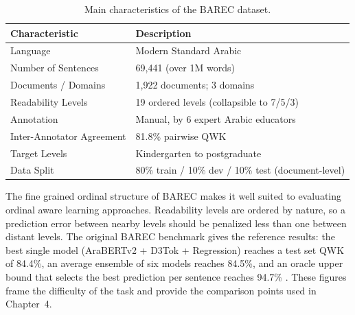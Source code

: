 \documentclass[12pt]{report}
\begin{document}
\begin{table}[H]

\centering

\caption{Main characteristics of the BAREC dataset.}

\label{tab:barec_characteristics}

\begin{tabular}{p{5cm} p{6cm}}

\toprule

\textbf{Characteristic} & \textbf{Description} \\

\midrule

Language & Modern Standard Arabic \\

Number of Sentences & 69,441 (over 1M words) \\

Documents / Domains & 1,922 documents; 3 domains \\

Readability Levels & 19 ordered levels (collapsible to 7/5/3) \\

Annotation & Manual, by 6 expert Arabic educators \\

Inter-Annotator Agreement & 81.8\% pairwise QWK \\

Target Levels & Kindergarten to postgraduate \\

Data Split & 80\% train / 10\% dev / 10\% test (document-level) \\

\bottomrule

\end{tabular}

\end{table}

The fine grained ordinal structure of BAREC makes it well suited to evaluating ordinal aware learning approaches. Readability levels are ordered by nature, so a prediction error between nearby levels should be penalized less than one between distant levels. The original BAREC benchmark gives the reference results: the best single model (AraBERTv2 + D3Tok + Regression) reaches a test set QWK  of 84.4\%, an average ensemble of six models reaches 84.5\%, and an oracle upper bound that selects the best prediction per sentence reaches 94.7\% \cite{elmadani2025barec}. These figures frame the difficulty of the task and provide the comparison points used in Chapter~4.
\end{document}

